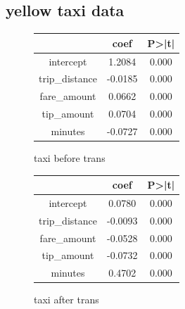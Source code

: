 \documentclass[11pt]{article}
\begin{document}
\subsection{yellow taxi data}
\begin{figure}[H]
  \begin{minipage}[b]{0.5\textwidth} 
    \centering
    \begin{tabular}{c|c|c} \hline
    & coef & P\textgreater\left|t\right| \\ \hline    
    intercept & 1.2084 & 0.000 \\
    trip\_distance & -0.0185 & 0.000 \\
    fare\_amount & 0.0662 & 0.000 \\
    tip\_amount & 0.0704 & 0.000 \\
    minutes & -0.0727 & 0.000 \\
    \hline
    \end{tabular} 
    \caption{taxi before trans}
    \label{tab:my_label}
  \end{minipage}%
  \begin{minipage}[b]{0.5\textwidth} 
    \centering 
    \begin{tabular}{c|c|c} \hline
    & coef & P\textgreater\left|t\right| \\ \hline     
    intercept & 0.0780 & 0.000 \\
    trip\_distance & -0.0093 & 0.000 \\
    fare\_amount & -0.0528 & 0.000 \\
    tip\_amount & -0.0732 & 0.000 \\
    minutes & 0.4702 & 0.000 \\
    \hline
    \end{tabular} 
    \caption{taxi after trans}
    \label{tab:my_label}
\end{minipage} 
\end{figure}
\end{document}
